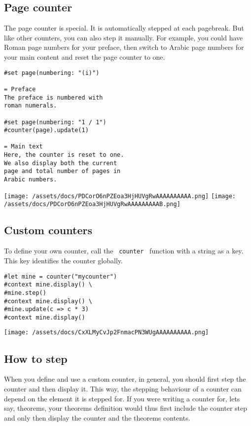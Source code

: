 \subsection{Page counter}\label{page-counter}

The page counter is special. It is automatically stepped at each
pagebreak. But like other counters, you can also step it manually. For
example, you could have Roman page numbers for your preface, then switch
to Arabic page numbers for your main content and reset the page counter
to one.

\begin{verbatim}
#set page(numbering: "(i)")

= Preface
The preface is numbered with
roman numerals.

#set page(numbering: "1 / 1")
#counter(page).update(1)

= Main text
Here, the counter is reset to one.
We also display both the current
page and total number of pages in
Arabic numbers.
\end{verbatim}

\texttt{[image: /assets/docs/PDCorO6nPZEoa3HjHUVgRwAAAAAAAAAA.png]}
\texttt{[image: /assets/docs/PDCorO6nPZEoa3HjHUVgRwAAAAAAAAAB.png]}

\subsection{Custom counters}\label{custom-counters}

To define your own counter, call the \texttt{\ counter\ } function with
a string as a key. This key identifies the counter globally.

\begin{verbatim}
#let mine = counter("mycounter")
#context mine.display() \
#mine.step()
#context mine.display() \
#mine.update(c => c * 3)
#context mine.display()
\end{verbatim}

\texttt{[image: /assets/docs/CxXLMyCvJp2FnmacPN3WUgAAAAAAAAAA.png]}

\subsection{How to step}\label{how-to-step}

When you define and use a custom counter, in general, you should first
step the counter and then display it. This way, the stepping behaviour
of a counter can depend on the element it is stepped for. If you were
writing a counter for, let\textquotesingle s say, theorems, your
theorem\textquotesingle s definition would thus first include the
counter step and only then display the counter and the
theorem\textquotesingle s contents.

